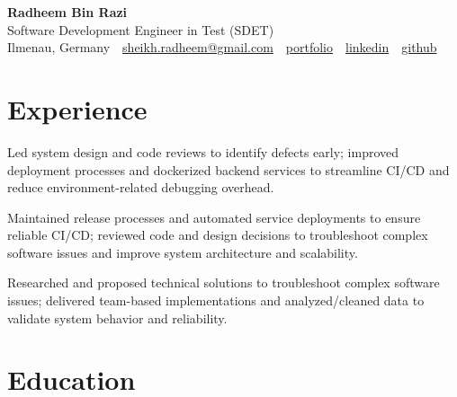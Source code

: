 \documentclass[11pt,a4paper]{resume}
\makeatletter
\newcommand{\Portfolio}{https://radheem.github.io/my-cv}
\newcommand{\PortfolioText}{portfolio}
\newcommand{\GitHub}{https://github.com/radheem}
\newcommand{\LinkedIn}{https://www.linkedin.com/in/radheem-razi}
\newcommand{\Email}{sheikh.radheem@gmail.com}
\makeatother
\begin{document}
\begin{center}
  {\huge\bfseries Radheem Bin Razi}\\[3pt]
  {\large Software Development Engineer in Test (SDET)}\\[6pt]
  \small
  Ilmenau, Germany \,\textbar\,
  \href{mailto:\Email}{\Email} \,\textbar\,
  \href{\Portfolio}{\PortfolioText} \,\textbar\,
  \href{\LinkedIn}{linkedin} \,\textbar\,
  \href{\GitHub}{github}
\end{center}
\vspace{2pt}

\section{Experience}

\bullets
  \item Led system design and code reviews to identify defects early; improved deployment processes and dockerized backend services to streamline CI/CD and reduce environment-related debugging overhead.
\bulletsend
\vspace{3pt}
\bullets
  \item Maintained release processes and automated service deployments to ensure reliable CI/CD; reviewed code and design decisions to troubleshoot complex software issues and improve system architecture and scalability.
\bulletsend
\vspace{3pt}
\bullets
  \item Researched and proposed technical solutions to troubleshoot complex software issues; delivered team-based implementations and analyzed/cleaned data to validate system behavior and reliability.
\bulletsend
\vspace{3pt}

\section{Education}

\vspace{2pt}
\end{document}
